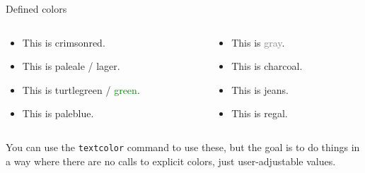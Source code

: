 \begin{frame}[c]{Defined colors}

		\begin{columns}[t]
		\begin{column}[T]{5.5cm}
			\begin{itemize}
			\item This is \textcolor{crimsonred}{crimsonred}.
			\item This is \textcolor{paleale}{paleale} / \textcolor{lager}{lager}.
			\item This is \textcolor{turtlegreen}{turtlegreen} / \textcolor{green}{green}.
			\item This is \textcolor{paleblue}{paleblue}.
			\end{itemize}
		\end{column}

		\begin{column}[T]{5.5cm}
			\begin{itemize}
			\item This is \textcolor{gray}{gray}.
			\item This is \textcolor{charcoal}{charcoal}.
			\item This is \textcolor{jeans}{jeans}.
			\item This is \textcolor{regal}{regal}.
			\end{itemize}
		\end{column}
		\end{columns}
		\vspace{1em}

You can use the \alert{\texttt{textcolor}} command to use these, but the goal is to do things in a way where there are no calls to explicit colors, just user-adjustable values.
\end{frame}



